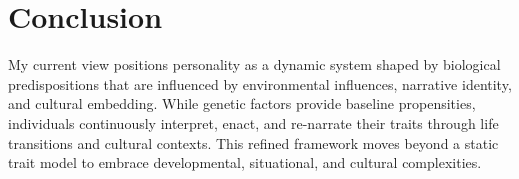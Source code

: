 \documentclass[stu]{apa7}
\begin{document}
\section{Conclusion}

My current view positions personality as a dynamic system shaped by biological predispositions that are influenced by environmental influences, narrative identity, and cultural embedding. While genetic factors provide baseline propensities, individuals continuously interpret, enact, and re-narrate their traits through life transitions and cultural contexts. This refined framework moves beyond a static trait model to embrace developmental, situational, and cultural complexities. 


\printbibliography
\end{document}
